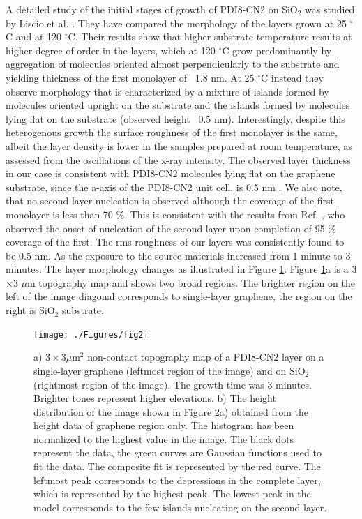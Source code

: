 \documentclass[preprint,aip,jap]{revtex4-2}
\begin{document}
 
A detailed study of the initial stages of growth of PDI8-CN2 on SiO$_{2}$ was studied by Liscio et al.
\cite{liscio-2013}.
 They have compared the morphology of the layers grown at 25 $^\circ$C and at 120 $^\circ$C.
 Their results show that higher substrate temperature results at higher degree of order in the layers, which at 120 $^\circ$C grow predominantly by aggregation of molecules oriented almost perpendicularly to the substrate and yielding thickness of the first monolayer of ~1.8 nm.
 At 25 $^\circ$C instead they observe morphology that is characterized by a mixture of islands formed by molecules oriented upright on the substrate and the islands formed by molecules lying flat on the substrate (observed height ~0.5 nm).
 Interestingly, despite this heterogenous growth the surface roughness of the first monolayer is the same, albeit the layer density is lower in the samples prepared at room temperature, as assessed from the oscillations of the x-ray intensity.
The observed layer thickness in our case is consistent with PDI8-CN2 molecules lying flat on the graphene substrate, since the a-axis of the PDI8-CN2 unit cell, is 0.5 nm \cite{liscio-2012}.
 We also note, that no second layer nucleation is observed although the coverage of the first monolayer is less than 70 \%.
 This is consistent with the results from Ref.
 , who observed the onset of nucleation of the second layer upon completion of 95 \% coverage of the first.
 The rms roughness of our layers was consistently found to be 0.5 nm.
 As the exposure to the source materials increased from 1 minute to 3 minutes.
 The layer morphology changes as illustrated in Figure \ref{fig:2}.
 Figure \ref{fig:2}a is a  3$\times$3 $\mu$m topography map and shows two broad regions.
 The brighter region on the left of the image diagonal corresponds to single-layer graphene, the region on the right is SiO$_{2}$ substrate.

\begin{figure}[htb]
  \centering
   \texttt{[image: ./Figures/fig2]}
  \caption{a) $3\times3 \mu$m$^{2}$ non-contact topography map of a PDI8-CN2 layer on a single-layer graphene (leftmost region of the image) and on SiO$_{2}$ (rightmost region of the image).
 The growth time was 3 minutes.
 Brighter tones represent higher elevations.
 b) The height distribution of the image shown in Figure 2a) obtained from the height data of graphene region only.
 The histogram has been normalized to the highest value in the image.
 The black dots represent the data, the green curves are Gaussian functions used to fit the data.
 The composite fit is represented by the red curve.
  The leftmost peak corresponds to the depressions in the complete layer, which is represented by the highest peak.
 The lowest peak in the model corresponds to the few islands nucleating on the second layer.
}  \label{fig:2}
\end{figure}
\end{document}
